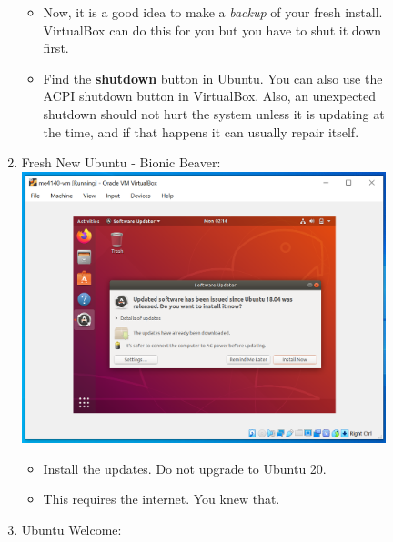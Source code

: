 \documentclass[12pt]{article}
\begin{document}
\begin{description}
\begin{description}
\begin{enumerate}[label=\alph*)]
      		 \begin{itemize}
      		\item Now, it is a good idea to make a {\it backup} of your fresh install. VirtualBox can do this for you but you have to shut it down first.  
         
     		\item Find the {\bf shutdown} button in Ubuntu. You can also use the ACPI shutdown button in VirtualBox. Also, an unexpected shutdown should not hurt the system unless it is updating at the time, and if that happens it can usually repair itself. 
    		\end{itemize}
    		
    		\newpage
    		\item Fresh New Ubuntu - Bionic Beaver: \vspace{5mm} \\
      		\includegraphics[scale=.55]{Capture25.png}
      		 \begin{itemize}
        	\item Install the updates. Do not upgrade to Ubuntu 20.
        	\item This requires the internet. You knew that. 
    		\end{itemize} 
    		 \vspace{5mm} 
    		\item Ubuntu Welcome: \vspace{5mm} \\

\end{enumerate}
\end{description}
\end{description}
\end{document}
